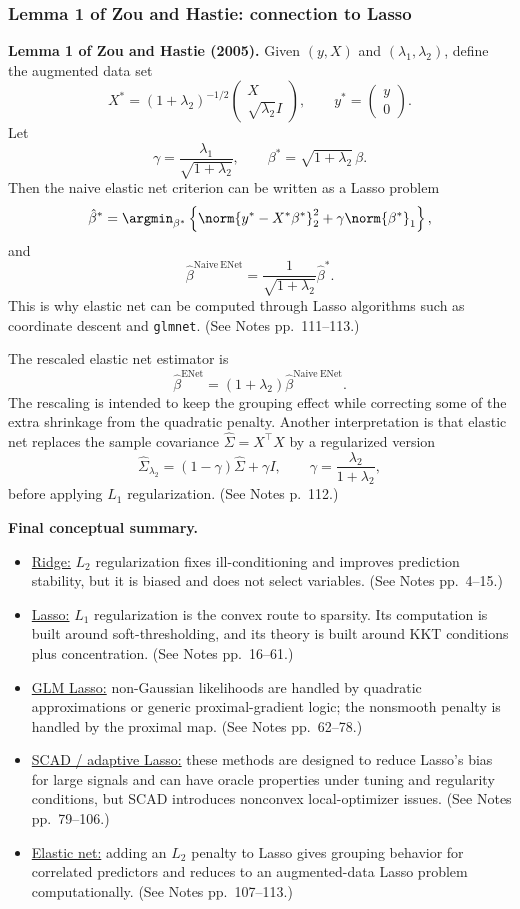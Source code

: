 \subsubsection{Lemma 1 of Zou and Hastie: connection to Lasso}
\textbf{Lemma 1 of Zou and Hastie (2005).}
Given $(y,X)$ and $(\lambda_1,\lambda_2)$, define the augmented data set
\[
X^*=(1+\lambda_2)^{-1/2}
\begin{pmatrix}
X\\
\sqrt{\lambda_2}I
\end{pmatrix},
\qquad
y^*=
\begin{pmatrix}
y\\
0
\end{pmatrix}.
\]
Let
\[
\gamma=\frac{\lambda_1}{\sqrt{1+\lambda_2}},
\qquad
\beta^*=\sqrt{1+\lambda_2}\,\beta.
\]
Then the naive elastic net criterion can be written as a Lasso problem
\[
\hat\beta^*
=\argmin_{\beta^*}
\left\{
\norm{y^*-X^*\beta^*}_2^2
+\gamma\norm{\beta^*}_1
\right\},
\]
and
\[
\hat\beta^{\mathrm{Naive\ ENet}}
=\frac{1}{\sqrt{1+\lambda_2}}\hat\beta^*.
\]
This is why elastic net can be computed through Lasso algorithms such as coordinate descent and \texttt{glmnet}. (See Notes pp.~111--113.)

The rescaled elastic net estimator is
\[
\hat\beta^{\mathrm{ENet}}
=(1+\lambda_2)\hat\beta^{\mathrm{Naive\ ENet}}.
\]
The rescaling is intended to keep the grouping effect while correcting some of the extra shrinkage from the quadratic penalty. Another interpretation is that elastic net replaces the sample covariance $\hat\Sigma=X^\top X$ by a regularized version
\[
\hat\Sigma_{\lambda_2}
=(1-\gamma)\hat\Sigma+\gamma I,
\qquad
\gamma=\frac{\lambda_2}{1+\lambda_2},
\]
before applying $L_1$ regularization. (See Notes p.~112.)

\begin{mybox}
\textbf{Final conceptual summary.}
\begin{itemize}
    \item \underline{Ridge:} $L_2$ regularization fixes ill-conditioning and improves prediction stability, but it is biased and does not select variables. (See Notes pp.~4--15.)
    \item \underline{Lasso:} $L_1$ regularization is the convex route to sparsity. Its computation is built around soft-thresholding, and its theory is built around KKT conditions plus concentration. (See Notes pp.~16--61.)
    \item \underline{GLM Lasso:} non-Gaussian likelihoods are handled by quadratic approximations or generic proximal-gradient logic; the nonsmooth penalty is handled by the proximal map. (See Notes pp.~62--78.)
    \item \underline{SCAD / adaptive Lasso:} these methods are designed to reduce Lasso's bias for large signals and can have oracle properties under tuning and regularity conditions, but SCAD introduces nonconvex local-optimizer issues. (See Notes pp.~79--106.)
    \item \underline{Elastic net:} adding an $L_2$ penalty to Lasso gives grouping behavior for correlated predictors and reduces to an augmented-data Lasso problem computationally. (See Notes pp.~107--113.)
\end{itemize}
\end{mybox}
